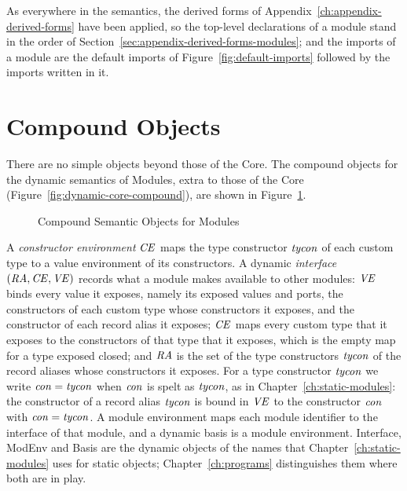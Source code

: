 As everywhere in the semantics, the derived forms of
Appendix~\ref{ch:appendix-derived-forms} have been applied, so the
top-level declarations of a module stand in the order of
Section~\ref{sec:appendix-derived-forms-modules}; and the imports of a module
are the default imports of Figure~\ref{fig:default-imports} followed by the
imports written in it.

\section{Compound Objects}\label{sec:dynamic-modules-compound}

There are no simple objects beyond those of the Core. The compound objects
for the dynamic semantics of Modules, extra to those of the Core
(Figure~\ref{fig:dynamic-core-compound}), are shown in
Figure~\ref{fig:dynamic-modules-compound}.

\begin{figure}[htbp]
\centering
\begin{objtable}
\end{objtable}
\caption{Compound Semantic Objects for Modules}
\label{fig:dynamic-modules-compound}
\end{figure}

A \emph{constructor environment} $\mathit{CE}$ maps the type constructor
$\mathit{tycon}$ of each custom type to a value environment of its constructors. A
dynamic \emph{interface} $(\mathit{RA},\mathit{CE},\mathit{VE})$ records what a module makes
available to other modules: $\mathit{VE}$ binds every value it exposes, namely its
exposed values and ports, the constructors of each custom type whose
constructors it exposes, and the constructor of each record alias it
exposes; $\mathit{CE}$ maps every custom type that it exposes to the constructors
of that type that it exposes, which is the empty map for a type exposed
closed; and $\mathit{RA}$ is the set of the type constructors $\mathit{tycon}$ of the
record aliases whose constructors it exposes. %
For a type constructor $\mathit{tycon}$ we write $\mathit{con}=\mathit{tycon}$ when $\mathit{con}$ is spelt
as $\mathit{tycon}$, as in Chapter~\ref{ch:static-modules}: the constructor of a
record alias $\mathit{tycon}$ is bound in $\mathit{VE}$ to the constructor $\mathit{con}$ with
$\mathit{con}=\mathit{tycon}$. A module
environment maps each module identifier to the interface of that module, and
a dynamic basis is a module environment. Interface, ModEnv and Basis are the
dynamic objects of the names that Chapter~\ref{ch:static-modules} uses for
static objects; Chapter~\ref{ch:programs} distinguishes them where both are in
play.

